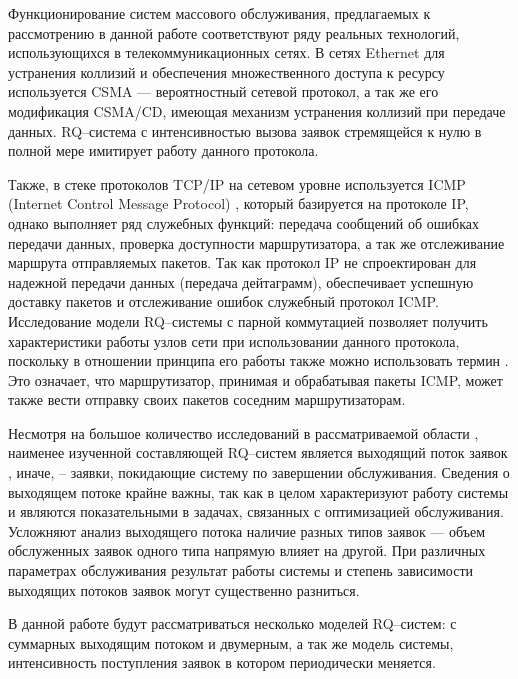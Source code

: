 Функционирование систем массового обслуживания, предлагаемых к рассмотрению в данной работе соответствуют ряду реальных технологий, использующихся в телекоммуникационных сетях. В сетях Ethernet для устранения коллизий и обеспечения множественного доступа к ресурсу используется CSMA \cite{christensen2010ieee,nutt1982performance} --- вероятностный сетевой протокол, а так же его модификация CSMA/CD, имеющая механизм устранения коллизий при передаче данных. RQ--система с интенсивностью вызова заявок стремящейся к нулю в полной мере имитирует работу данного протокола.

Также, в стеке протоколов TCP/IP на сетевом уровне используется ICMP (Internet Control Message Protocol) \cite{bellovin2003icmp}, который базируется на протоколе IP, однако выполняет ряд служебных функций: передача сообщений об ошибках передачи данных, проверка доступности маршрутизатора, а так же отслеживание маршрута отправляемых пакетов. Так как протокол IP не спроектирован для надежной передачи данных (передача дейтаграмм), обеспечивает успешную доставку пакетов и отслеживание ошибок служебный протокол ICMP. Исследование модели RQ--системы с парной коммутацией позволяет получить характеристики работы узлов сети при использовании данного протокола, поскольку в отношении принципа его работы также можно использовать термин . Это означает, что маршрутизатор, принимая и обрабатывая пакеты ICMP, может также вести отправку своих пакетов соседним маршрутизаторам. 

Несмотря на большое количество исследований в рассматриваемой области \cite{artalejo2010mean,nazarov2017asymptotic,phung2019retrial,kulkarni1983queueing,paul2018retrial}, наименее изученной составляющей RQ--систем является выходящий поток заявок \cite{daley1976queueing}, иначе, -- заявки, покидающие систему по завершении обслуживания. Сведения о выходящем потоке крайне важны, так как в целом характеризуют работу системы и являются показательными в задачах, связанных с оптимизацией обслуживания. Усложняют анализ выходящего потока наличие разных типов заявок --- объем обслуженных заявок одного типа напрямую влияет на другой. При различных параметрах обслуживания результат работы системы и степень зависимости выходящих потоков заявок могут существенно разниться. 

В данной работе будут рассматриваться несколько моделей RQ--систем: с суммарных выходящим потоком и двумерным, а так же модель системы, интенсивность поступления заявок в котором периодически меняется.

